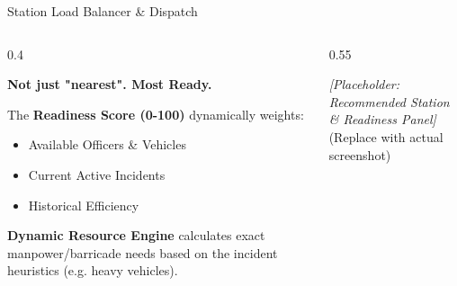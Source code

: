 \documentclass[aspectratio=169, xcolor=table]{beamer}
\newcommand{\demoPlaceholder}[2]{
    \begin{tcolorbox}[colback=SentinelSurfaceRaised, colframe=SentinelSurfaceRaised, arc=4mm, height=#1, valign=center, halign=center]
        \textcolor{SentinelTextSec}{\Large \textit{[Placeholder: #2]}} \\
        \vspace{2mm}
        \textcolor{SentinelTextSec}{\small (Replace with actual screenshot)}
    \end{tcolorbox}
}
\begin{document}
\begin{frame}{Station Load Balancer \& Dispatch}
    \begin{columns}[T]
        \begin{column}{0.4\textwidth}
            \begin{tcolorbox}[sentinelcard]
                \textbf{Not just "nearest". Most Ready.}
                \vspace{0.3cm}
                
                \small
                The \textbf{Readiness Score (0-100)} dynamically weights:
                \begin{itemize}
                    \item Available Officers \& Vehicles
                    \item Current Active Incidents
                    \item Historical Efficiency
                \end{itemize}
                \vspace{0.3cm}
                
                \textbf{Dynamic Resource Engine} calculates exact manpower/barricade needs based on the incident heuristics (e.g. heavy vehicles).
            \end{tcolorbox}
        \end{column}
        
        \begin{column}{0.55\textwidth}
            \demoPlaceholder{6.5cm}{Recommended Station \& Readiness Panel}
        \end{column}
    \end{columns}
\end{frame}
\end{document}
